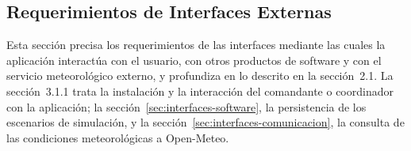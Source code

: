 \subsection{Requerimientos de Interfaces Externas}


  Esta sección precisa los requerimientos de las interfaces mediante las cuales la aplicación interactúa con el usuario, con otros productos de software y con el servicio meteorológico externo, y profundiza en lo descrito en la sección~2.1. La sección~3.1.1 trata la instalación y la interacción del comandante o coordinador con la aplicación; la sección~\textcolor{black}{\ref{sec:interfaces-software}}, la persistencia de los escenarios de simulación, y la sección~\textcolor{black}{\ref{sec:interfaces-comunicacion}}, la consulta de las condiciones meteorológicas a Open-Meteo.



